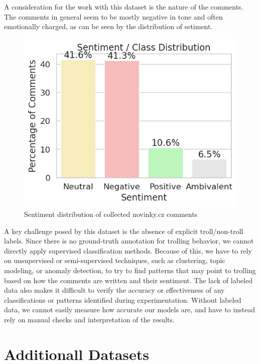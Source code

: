\documentclass[twoside]{ctuthesis}
\theoremstyle{plain}
\theoremstyle{definition}
\theoremstyle{note}
\begin{document}
A consideration for the work with this dataset is the nature of the comments. The comments in general seem to be mostly negative in tone and often emotionally charged, as can be seen by the distribution of setiment.

\begin{figure}[htbp]          
	\centering                 
	\includegraphics[scale=0.7]{figures/sentiment.png}
	\caption{Sentiment distribution of collected novinky.cz comments}    
	\label{fig:myplot}          
\end{figure}

A key challenge posed by this dataset is the absence of explicit troll/non-troll labels. Since there is no ground-truth annotation for trolling behavior, we cannot directly apply supervised classification methods. Because of this, we have to rely on unsupervised or semi-supervised techniques, such as clustering, topic modeling, or anomaly detection, to try to find patterns that may point to trolling based on how the comments are written and their sentiment. The lack of labeled data also makes it difficult to verify the accuracy or effectiveness of any classifications or patterns identified during experimentation. Without labeled data, we cannot easily measure how accurate our models are, and have to instead rely on manual checks and interpretation of the results.\par

\section{Additionall Datasets}
\end{document}
